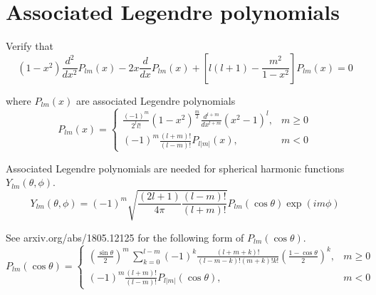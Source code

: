 

\section*{Associated Legendre polynomials}

Verify that
\begin{equation*}
(1-x^2)\frac{d^2}{dx^2}P_{lm}(x)-2x\frac{d}{dx}P_{lm}(x)+\left[l(l+1)-\frac{m^2}{1-x^2}\right]P_{lm}(x)=0
\tag{1}
\end{equation*}

where $P_{lm}(x)$ are associated Legendre polynomials
\begin{equation*}
P_{lm}(x)=\begin{cases}
\displaystyle
\frac{(-1)^m}{2^ll!}(1-x^2)^\frac{m}{2}\frac{d^{l+m}}{dx^{l+m}}(x^2-1)^l, & m\ge0
\\[3ex]
\displaystyle
(-1)^m\frac{(l+m)!}{(l-m)!}P_{l|m|}(x), & m<0
\end{cases}
\end{equation*}

Associated Legendre polynomials are needed for spherical harmonic functions $Y_{lm}(\theta,\phi)$.
\begin{equation*}
Y_{lm}(\theta,\phi)=(-1)^m\sqrt{\frac{(2l+1)}{4\pi}\frac{(l-m)!}{(l+m)!}}
P_{lm}(\cos\theta)\exp(im\phi)
\end{equation*}

See arxiv.org/abs/1805.12125 for the following form of $P_{lm}(\cos\theta)$.
\begin{equation*}
P_{lm}(\cos\theta)=\begin{cases}
\displaystyle
\left(\frac{\sin\theta}{2}\right)^m\,\sum_{k=0}^{l-m}
(-1)^k\frac{(l+m+k)!}{(l-m-k)!(m+k)!k!}
\left(\frac{1-\cos\theta}{2}\right)^k, & m\ge0
\\[4ex]
\displaystyle
(-1)^m\frac{(l+m)!}{(l-m)!}P_{l|m|}(\cos\theta), & m<0
\end{cases}
\end{equation*}


